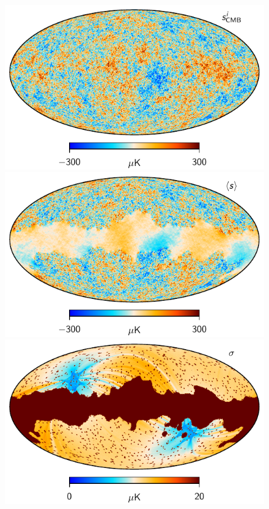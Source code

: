 \documentclass[twocolumn]{aa}
\begin{document}
\begin{figure}[t]
  \center
  \includegraphics[width=\linewidth]{figs/cmb_BP10_highl_sample.pdf}\\
  \includegraphics[width=\linewidth]{figs/cmb_BP10_highl_mean.pdf}\\
  \includegraphics[width=\linewidth]{figs/cmb_BP10_highl_rms.pdf}

\end{figure}
\end{document}
